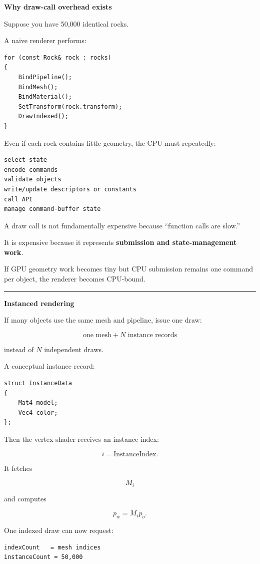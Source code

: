 \textbf{Why draw-call overhead exists}

Suppose you have 50,000 identical rocks.

A naive renderer performs:

\begin{verbatim}
for (const Rock& rock : rocks)
{
    BindPipeline();
    BindMesh();
    BindMaterial();
    SetTransform(rock.transform);
    DrawIndexed();
}
\end{verbatim}

Even if each rock contains little geometry, the CPU must repeatedly:

\begin{verbatim}
select state
encode commands
validate objects
write/update descriptors or constants
call API
manage command-buffer state
\end{verbatim}

A draw call is not fundamentally expensive because ``function calls are slow.''

It is expensive because it represents \textbf{submission and state-management work}.

If GPU geometry work becomes tiny but CPU submission remains one command per object, the renderer becomes CPU-bound.

\begin{center}\rule{0.5\linewidth}{0.5pt}\end{center}

\textbf{Instanced rendering}

If many objects use the same mesh and pipeline, issue one draw:

\[
\boxed{
\text{one mesh}
+
N\text{ instance records}
}
\]

instead of \(N\) independent draws.

A conceptual instance record:

\begin{verbatim}
struct InstanceData
{
    Mat4 model;
    Vec4 color;
};
\end{verbatim}

Then the vertex shader receives an instance index:

\[
i=\text{InstanceIndex}.
\]

It fetches

\[
M_i
\]

and computes

\[
p_w=M_i p_o.
\]

One indexed draw can now request:

\begin{verbatim}
indexCount   = mesh indices
instanceCount = 50,000
\end{verbatim}

